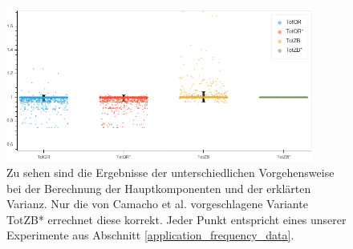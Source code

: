 \begin{figure}
\centering
\includegraphics[width = 0.9\textwidth]{figures/total_variance_validation.png}
\caption{Zu sehen sind die Ergebnisse der unterschiedlichen Vorgehensweise bei der Berechnung der Hauptkomponenten und der erklärten Varianz. Nur die von Camacho et al. vorgeschlagene Variante TotZB* errechnet diese korrekt. Jeder Punkt entspricht eines unserer Experimente aus Abschnitt \ref{application_frequency_data}.}
\label{total_variance_validation}
\end{figure}